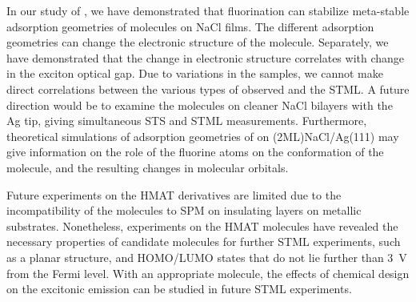 In our study of , we have demonstrated that fluorination can stabilize meta-stable adsorption geometries of molecules on NaCl films. The different adsorption geometries can change the electronic structure of the molecule. Separately, we have demonstrated that the change in electronic structure correlates with change in the exciton optical gap. Due to variations in the samples, we cannot make direct correlations between the various types of  observed and the \ac{STML}. A future direction would be to examine the molecules on cleaner NaCl bilayers with the Ag tip, giving simultaneous \ac{STS} and \ac{STML} measurements. Furthermore, theoretical simulations of adsorption geometries of  on (2ML)NaCl/Ag(111) may give information on the role of the fluorine atoms on the conformation of the molecule, and the resulting changes in molecular orbitals.

Future experiments on the HMAT derivatives are limited due to the incompatibility of the molecules to \ac{SPM} on insulating layers on metallic substrates. Nonetheless, experiments on the HMAT molecules have revealed the necessary properties of candidate molecules for further \ac{STML} experiments, such as a planar structure, and HOMO/LUMO states that do not lie further than \SI{3}{V} from the Fermi level. With an appropriate molecule, the effects of chemical design on the excitonic emission can be studied in future \ac{STML} experiments.





                                    